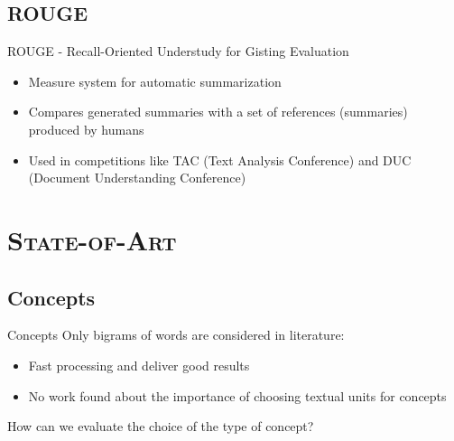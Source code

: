 \documentclass[xcolor=x11names,compress]{beamer}
\renewcommand{\(}{\begin{columns}}
\renewcommand{\)}{\end{columns}}
\newcommand{\<}[1]{\begin{column}{#1}}
\renewcommand{\>}{\end{column}}
\begin{document}
\subsection{ROUGE}
\begin{frame}{ROUGE - Recall-Oriented Understudy for Gisting Evaluation}
\begin{itemize}
\item Measure system for automatic summarization \\
\item Compares generated summaries with a set of references (summaries) produced by humans
\item Used in competitions like TAC (Text Analysis Conference) and DUC (Document Understanding Conference)
\end{itemize}
\end{frame}


\section{\scshape State-of-Art}
\subsection{Concepts}
\begin{frame}{Concepts}
Only bigrams of words are considered in literature:\\
\begin{itemize}
\item Fast processing and deliver good results\\
\item No work found about the importance of choosing textual units for concepts
\end{itemize}

How can we evaluate the choice of the type of concept?

\end{frame}


\end{document}
